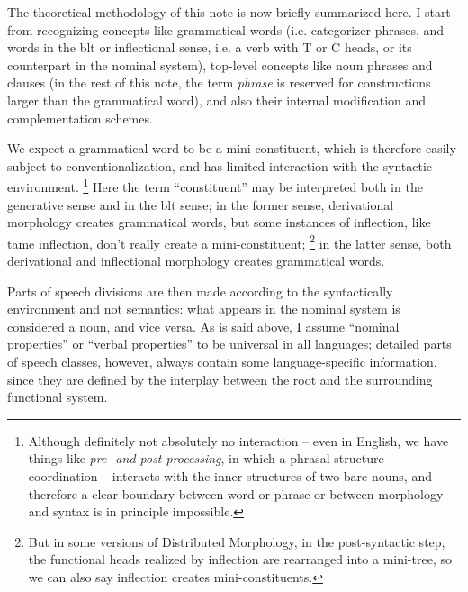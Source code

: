 \documentclass[UTF8, a4paper, oneside, scheme=plain, 12pt]{ctexrep}
\newcommand*{\term}[1]{\emph{#1}}
\newcommand{\form}[1]{\emph{#1}}
\begin{document}
{The theoretical methodology of this note is now briefly summarized here.
I start from recognizing concepts like grammatical words 
(i.e. categorizer phrases, and words in the \acs{blt} or inflectional sense, 
i.e. a verb with T or C heads, or its counterpart in the nominal system), 
top-level concepts like noun phrases and clauses
(in the rest of this note, the term \term{phrase} is reserved 
for constructions larger than the grammatical word), 
and also their internal modification and complementation schemes. 

We expect a grammatical word to be a mini-constituent, 
which is therefore easily subject to conventionalization, 
and has limited interaction with the syntactic environment.%
\footnote{
    Although definitely not absolutely no interaction -- 
    even in English, we have things like \form{pre- and post-processing}, 
    in which a phrasal structure -- coordination -- interacts 
    with the inner structures of two bare nouns, 
    and therefore a clear boundary between word or phrase 
    or between morphology and syntax is in principle impossible.
}
Here the term ``constituent'' may be interpreted 
both in the generative sense and in the \acs{blt} sense; 
in the former sense, derivational morphology creates grammatical words, 
but some instances of inflection, like \acs{tame} inflection, 
don't really create a mini-constituent;%
\footnote{
    But in some versions of Distributed Morphology, 
    in the post-syntactic step, 
    the functional heads realized by inflection are rearranged into a mini-tree, 
    so we can also say inflection creates mini-constituents.
} 
in the latter sense, both derivational and inflectional morphology
creates grammatical words. 

Parts of speech divisions are then made according to the 
syntactically environment and not semantics: 
what appears in the nominal system is considered a noun, 
and vice versa. 
As is said above, 
I assume ``nominal properties'' or ``verbal properties'' 
to be universal in all languages; 
detailed parts of speech classes, however, 
always contain some language-specific information,
since they are defined by the interplay 
between the root and the surrounding functional system. 

}
\end{document}
